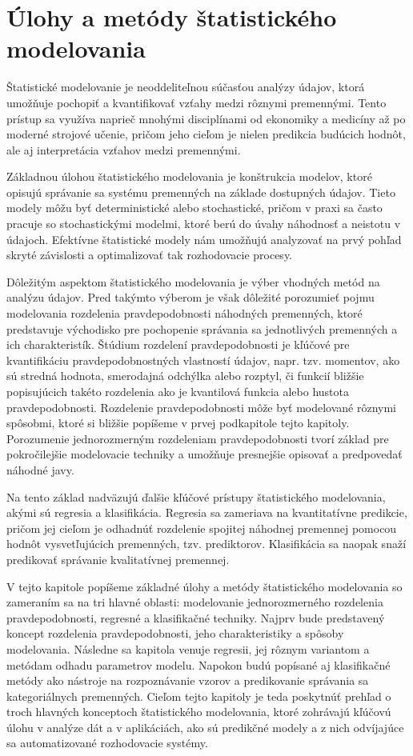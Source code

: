 \chapter{Úlohy a metódy štatistického modelovania}\label{sec:ulohy_metody}

Štatistické modelovanie je neoddeliteľnou súčasťou analýzy údajov, ktorá umožňuje pochopiť a kvantifikovať vzťahy medzi rôznymi premennými. Tento prístup sa využíva naprieč mnohými disciplínami od ekonomiky a medicíny až po moderné strojové učenie, pričom jeho cieľom je nielen predikcia budúcich hodnôt, ale aj interpretácia vzťahov medzi premennými.

Základnou úlohou štatistického modelovania je konštrukcia modelov, ktoré opisujú správanie sa systému premenných na základe dostupných údajov. Tieto modely môžu byť deterministické alebo stochastické, pričom v praxi sa často pracuje so stochastickými modelmi, ktoré berú do úvahy náhodnosť a neistotu v údajoch. Efektívne štatistické modely nám umožňujú analyzovať na prvý pohľad skryté závislosti a optimalizovať tak rozhodovacie procesy.

Dôležitým aspektom štatistického modelovania je výber vhodných metód na analýzu údajov. Pred takýmto výberom je však dôležité porozumieť pojmu modelovania rozdelenia pravdepodobnosti náhodných premenných, ktoré predstavuje východisko pre pochopenie správania sa jednotlivých premenných a ich charakteristík. Štúdium rozdelení pravdepodobnosti je kľúčové pre kvantifikáciu pravdepodobnostných vlastností údajov, napr. tzv. momentov, ako sú stredná hodnota, smerodajná odchýlka alebo rozptyl, či funkcií bližšie popisujúcich takéto rozdelenia ako je kvantilová funkcia alebo hustota pravdepodobnosti. Rozdelenie pravdepodobnosti môže byť modelované rôznymi spôsobmi, ktoré si bližšie popíšeme v prvej podkapitole tejto kapitoly. Porozumenie jednorozmerným rozdeleniam pravdepodobnosti tvorí základ pre pokročilejšie modelovacie techniky a umožňuje presnejšie opisovať a predpovedať náhodné javy.

Na tento základ nadväzujú ďalšie kľúčové prístupy štatistického modelovania, akými sú regresia a klasifikácia. Regresia sa zameriava na kvantitatívne predikcie, pričom jej cieľom je odhadnúť rozdelenie spojitej náhodnej premennej pomocou hodnôt vysvetľujúcich premenných, tzv. prediktorov. Klasifikácia sa naopak snaží predikovať správanie kvalitatívnej premennej.

V tejto kapitole popíšeme základné úlohy a metódy štatistického modelovania so zameraním sa na tri hlavné oblasti: modelovanie jednorozmerného rozdelenia pravdepodobnosti, regresné a klasifikačné techniky. Najprv bude predstavený koncept rozdelenia pravdepodobnosti, jeho charakteristiky a spôsoby modelovania. Následne sa kapitola venuje regresii, jej rôznym variantom a metódam odhadu parametrov modelu. Napokon budú popísané aj klasifikačné metódy ako nástroje na rozpoznávanie vzorov a predikovanie správania sa kategoriálnych premenných. Cieľom tejto kapitoly je teda poskytnúť prehľad o troch hlavných konceptoch štatistického modelovania, ktoré zohrávajú kľúčovú úlohu v analýze dát a v aplikáciách, ako sú predikčné modely a z nich odvíjajúce sa automatizované rozhodovacie systémy.

